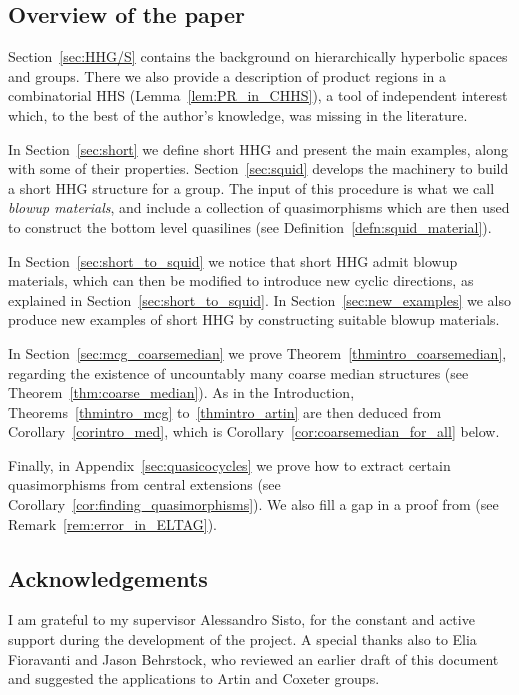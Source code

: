 \documentclass[svgnames]{amsart}
\theoremstyle{plain}
\theoremstyle{definition}
\begin{document}
\subsection*{Overview of the paper}
Section~\ref{sec:HHG/S} contains the background on hierarchically hyperbolic spaces and groups. There we also provide a description of product regions in a combinatorial HHS (Lemma~\ref{lem:PR_in_CHHS}), a tool of independent interest which, to the best of the author's knowledge, was missing in the literature. 

In Section~\ref{sec:short} we define short HHG and present the main examples, along with some of their properties. Section~\ref{sec:squid} develops the machinery to build a short HHG structure for a group. The input of this procedure is what we call \emph{blowup materials}, and include a collection of quasimorphisms which are then used to construct the bottom level quasilines (see Definition~\ref{defn:squid_material}). 

In Section~\ref{sec:short_to_squid} we notice that short HHG admit blowup materials, which can then be modified to introduce new cyclic directions, as explained in Section~\ref{sec:short_to_squid}. In Section~\ref{sec:new_examples} we also produce new examples of short HHG by constructing suitable blowup materials.


In Section~\ref{sec:mcg_coarsemedian} we prove Theorem~\ref{thmintro_coarsemedian}, regarding the existence of uncountably many coarse median structures (see Theorem~\ref{thm:coarse_median}). As in the Introduction, Theorems~\ref{thmintro_mcg} to~\ref{thmintro_artin} are then deduced from Corollary~\ref{corintro_med}, which is Corollary~\ref{cor:coarsemedian_for_all} below.

Finally, in Appendix~\ref{sec:quasicocycles} we prove how to extract certain quasimorphisms from central extensions (see Corollary~\ref{cor:finding_quasimorphisms}). We also fill a gap in a proof from \cite{ELTAG_HHS} (see Remark~\ref{rem:error_in_ELTAG}).

\subsection*{Acknowledgements}
I am grateful to my supervisor Alessandro Sisto, for the constant and active support during the development of the project. A special thanks also to Elia Fioravanti and Jason Behrstock, who reviewed an earlier draft of this document and suggested the applications to Artin and Coxeter groups.
\end{document}
